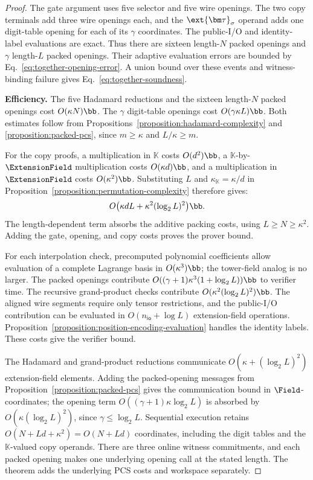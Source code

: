 \begin{proof}
The gate argument uses five selector and five wire openings.
The two copy terminals add three wire openings each, and the
\(\ext{\bm\tau}_\sigma\) operand adds one digit-table opening
for each of its \(\gamma\) coordinates.
The public-I/O and identity-label evaluations are exact.
Thus there are sixteen length-\(N\) packed openings and
\(\gamma\) length-\(L\) packed openings.
Their adaptive evaluation errors are bounded by
Eq.~\eqref{eq:together-opening-error}.
A union bound over these events and witness-binding failure
gives Eq.~\eqref{eq:together-soundness}.

\smallskip\noindent\textbf{Efficiency.}
The five Hadamard reductions and the sixteen length-\(N\)
packed openings cost \(O(\kappa N)\bb\).
The \(\gamma\) digit-table openings cost
\(O(\gamma\kappa L)\bb\).
Both estimates follow from
Propositions~\ref{proposition:hadamard-complexity} and
\ref{proposition:packed-pcs}, since \(m\geq\kappa\) and
\(L/\kappa\geq m\).

For the copy proofs, a multiplication in \(\mathbb K\) costs
\(O(d^2)\bb\), a \(\mathbb K\)-by-\(\ExtensionField\)
multiplication costs \(O(\kappa d)\bb\), and a multiplication
in \(\ExtensionField\) costs \(O(\kappa^2)\bb\).
Substituting \(L\) and \(\kappa_{\mathbb K}=\kappa/d\)
in Proposition~\ref{proposition:permutation-complexity}
therefore gives:
\[
    O\bigl(\kappa dL+\kappa^2(\log_2L)^2\bigr)\bb.
\]
The length-dependent term absorbs the additive packing costs,
using \(L\geq N\geq\kappa^2\).
Adding the gate, opening, and copy costs proves the prover bound.

For each interpolation check, precomputed polynomial coefficients
allow evaluation of a complete Lagrange basis in
\(O(\kappa^3)\bb\); the tower-field analog is no larger.
The packed openings contribute
\(O((\gamma+1)\kappa^3(1+\log_2L))\bb\)
to verifier time.
The recursive grand-product checks contribute
\(O(\kappa^2(\log_2L)^2)\bb\).
The aligned wire segments require only tensor restrictions,
and the public-I/O contribution can be evaluated in
\(O(n_{\mathsf{io}}+\log L)\) extension-field operations.
Proposition~\ref{proposition:position-encoding-evaluation}
handles the identity labels. These costs give the verifier bound.

The Hadamard and grand-product reductions communicate
\(O(\kappa+(\log_2L)^2)\) extension-field elements.
Adding the packed-opening messages from
Proposition~\ref{proposition:packed-pcs} gives the communication
bound in \(\Field\)-coordinates; the opening term
\(O((\gamma+1)\kappa\log_2L)\) is absorbed by
\(O(\kappa(\log_2L)^2)\), since \(\gamma\leq\log_2L\).
Sequential execution retains \(O(N+Ld+\kappa^2)=O(N+Ld)\)
coordinates, including the digit tables and the
\(\mathbb K\)-valued copy operands.
There are three online witness commitments, and each packed
opening makes one underlying opening call at the stated length.
The theorem adds the underlying PCS costs and workspace separately.
\end{proof}

